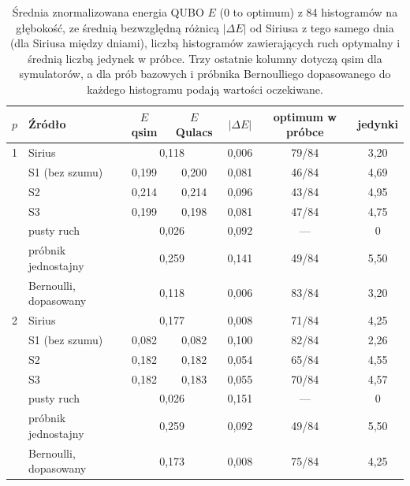 \begin{table}[t]
\caption{Średnia znormalizowana energia QUBO $E$ (0 to optimum) z 84 histogramów na głębokość, ze średnią bezwzględną różnicą $|\Delta E|$ od Siriusa z tego samego dnia (dla Siriusa między dniami), liczbą histogramów zawierających ruch optymalny i średnią liczbą jedynek w próbce. Trzy ostatnie kolumny dotyczą qsim dla symulatorów, a dla prób bazowych i próbnika Bernoulliego dopasowanego do każdego histogramu podają wartości oczekiwane.}
\label{tab:h3}
\centering
\small
\begin{tabular}{clccccc}
\toprule
$p$ & Źródło & $E$ qsim & $E$ Qulacs & $|\Delta E|$ & optimum w próbce & jedynki \\
\midrule
1 & Sirius & \multicolumn{2}{c}{0{,}118} & 0{,}006 & 79/84 & 3{,}20 \\
 & S1 (bez szumu) & 0{,}199 & 0{,}200 & 0{,}081 & 46/84 & 4{,}69 \\
 & S2 & 0{,}214 & 0{,}214 & 0{,}096 & 43/84 & 4{,}95 \\
 & S3 & 0{,}199 & 0{,}198 & 0{,}081 & 47/84 & 4{,}75 \\
 & pusty ruch & \multicolumn{2}{c}{0{,}026} & 0{,}092 & --- & 0 \\
 & próbnik jednostajny & \multicolumn{2}{c}{0{,}259} & 0{,}141 & 49/84 & 5{,}50 \\
 & Bernoulli, dopasowany & \multicolumn{2}{c}{0{,}118} & 0{,}006 & 83/84 & 3{,}20 \\
\midrule
2 & Sirius & \multicolumn{2}{c}{0{,}177} & 0{,}008 & 71/84 & 4{,}25 \\
 & S1 (bez szumu) & 0{,}082 & 0{,}082 & 0{,}100 & 82/84 & 2{,}26 \\
 & S2 & 0{,}182 & 0{,}182 & 0{,}054 & 65/84 & 4{,}55 \\
 & S3 & 0{,}182 & 0{,}183 & 0{,}055 & 70/84 & 4{,}57 \\
 & pusty ruch & \multicolumn{2}{c}{0{,}026} & 0{,}151 & --- & 0 \\
 & próbnik jednostajny & \multicolumn{2}{c}{0{,}259} & 0{,}092 & 49/84 & 5{,}50 \\
 & Bernoulli, dopasowany & \multicolumn{2}{c}{0{,}173} & 0{,}008 & 75/84 & 4{,}25 \\
\bottomrule
\end{tabular}
\end{table}
